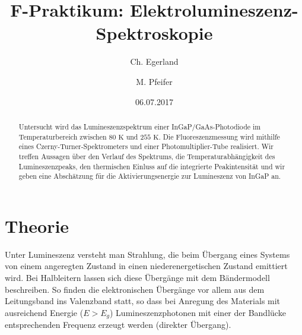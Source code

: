 \documentclass[aps,twocolumn,secnumarabic,nobalancelastpage,amsmath,amssymb,
nofootinbib,superscriptaddress]{revtex4-1}
\begin{document}
\title{F-Praktikum: Elektrolumineszenz-Spektroskopie}
\author         {Ch. Egerland}
\author         {M. Pfeifer}
\date[Versuchsdatum: ]{06.07.2017}

\begin{abstract}
Untersucht wird das Lumineszenzspektrum einer InGaP/GaAs-Photodiode im Temperaturbereich zwischen
$80\text{ K}$ und $255\text{ K}$. Die Fluoreszenzmessung wird mithilfe eines Czerny-Turner-Spektrometers
und einer Photomultiplier-Tube realisiert. Wir treffen Aussagen über den Verlauf des Spektrums, die
Temperaturabhängigkeit des Lumineszenzpeaks, den thermischen Einluss auf die integrierte Peakintensität und
wir geben eine Abschätzung für die Aktivierungsenergie zur Lumineszenz von InGaP an.
\end{abstract}


\maketitle



\section{Theorie}

\noindent Unter Lumineszenz versteht man Strahlung, die beim Übergang eines Systems von einem angeregten Zustand
in einen niederenergetischen Zustand emittiert wird. Bei Halbleitern lassen sich diese Übergänge mit dem Bändermodell
beschreiben. So finden die elektronischen Übergänge vor allem aus dem Leitungsband ins Valenzband statt, so dass bei
Anregung des Materials mit ausreichend Energie ($E>E_g$) Lumineszenzphotonen mit einer der Bandlücke entsprechenden
Frequenz erzeugt werden (direkter Übergang).\newline
\end{document}
